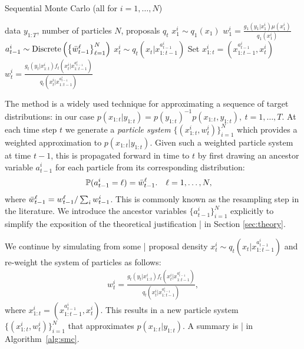 %
%

\begin{algorithm}[tb]
	\caption{Sequential Monte Carlo \hfill {\small (all for $i=1,\ldots,N$)}}
	\label{alg:smc}
	\begin{spacing}{1.2}
		\begin{algorithmic}[1]
			\renewcommand{\algorithmicrequire}{\textbf{Inputs:}}
			\renewcommand{\algorithmicensure}{\textbf{Outputs:}}				 
			\Require  data $y_{1:T}$, number of particles $N$, proposals $q_t$
			\State $x_1^i \sim q_1(x_1)$
			\State $w_1^i = \frac{g_1(y_1|x_1^i) \mu(x_1^i)}{q_1(x_1^i)}$
			\State $a_{t-1}^i \sim \operatorname*{Discrete}\left(\left\{\bar w_{t-1}^{\ell}\right\}_{\ell=1}^N\right)$%
			\State $x_t^i \sim q_t(x_t | x_{1:t-1}^{a_{t-1}^i})$ 
			\State Set $x_{1:t}^i = (x_{1:t-1}^{a_{t-1}^i},x_t^i)$
			\State $w_t^i = \frac{g_t(y_t|x_{1:t}^i) f_t(x_t^i | x_{1:t-1}^{a_{t-1}^i})}{q_t(x_t^i|x_{1:t-1}^{a_{t-1}^i})}$
			\EndFor
		\end{algorithmic}
	\end{spacing}
\end{algorithm}

The \smc method is a widely used technique for approximating a sequence of target distributions: in our case $p(x_{1:t}|y_{1:t}) = p(y_{1:t})^{-1} p(x_{1:t},y_{1:t}), ~t=1,\ldots,T$. 
At each time step $t$ we 
generate a \emph{particle system}
$\{(x_{1:t}^i,w_{t}^i)\}_{i=1}^N$ which provides a weighted approximation  to $p(x_{1:t}|y_{1:t})$. Given such a weighted particle system at time $t-1$, this 
is propagated forward in time to $t$ by first drawing an ancestor variable $a_{t-1}^i$ for each particle from its corresponding distribution:
\begin{align}
\mathbb{P}(a_{t-1}^i = \ell) &= \bar w_{t-1}^\ell.
&
\ell&=1,\ldots,N,
\end{align}
where $\bar w_{t-1}^\ell = w_{t-1}^\ell / \sum_i w_{t-1}^i$. This is commonly known as the resampling step in the literature. We introduce the ancestor variables $\{a_{t-1}^i\}_{i=1}^N$ explicitly to simplify the exposition of the theoretical justification | in Section \ref{sec:theory}.

We continue by simulating from some | proposal density $x_t^i \sim q_t(x_t | x_{1:t-1}^{a_{t-1}^i})$ and re-weight the system of particles as follows:
\begin{align}
\label{eq:smcweights}
w_t^i = \frac{g_t(y_t|x_{1:t}^i) f_t(x_t^i | x_{1:t-1}^{a_{t-1}^i})}{q_t(x_t^i|x_{1:t-1}^{a_{t-1}^i})},
\end{align}
where $x_{1:t}^i = (x_{1:t-1}^{a_{t-1}^i},x_t^i)$. This results in a new particle system $\{(x_{1:t}^i,w_t^i)\}_{i=1}^N$ that approximates $p(x_{1:t}|y_{1:t})$. A summary is | in Algorithm~\ref{alg:smc}.

